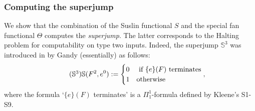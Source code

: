 \documentclass[reqno]{amsart}
\newcommand\be{\begin{equation}}
\newcommand\ee{\end{equation}}
\def\SJ{\mathbb{S}}
\numberwithin{equation}{section}
\numberwithin{thm}{section}
\begin{document}
\subsubsection{Computing the superjump}\label{pofu}
We show that the combination of the Suslin functional $S$ and the special fan functional $\Theta$ computes the \emph{superjump}.  
The latter corresponds to the Halting problem for computability on type two inputs.  Indeed, the superjump $\SJ^{3}$ was introduced in \cite{supergandy} by Gandy (essentially) as follows:
\be\tag{$\SJ^{3}$}
\SJ(F^{2},e^{0}):=
\begin{cases}
0 & \textup{ if $\{e\}(F)$ terminates}\\
1 & \textup{otherwise}
\end{cases},
\ee
where the formula `$\{e\}(F)$ terminates' is a $\Pi_{1}^{1}$-formula defined by Kleene's S1-S9.

\smallskip
\end{document}
